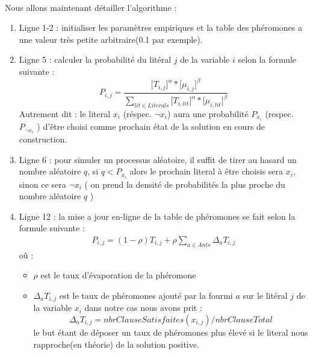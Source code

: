 	\paragraph{}Nous allons maintenant détailler l'algorithme : 
	\begin{enumerate}
		\item Ligne 1-2 : initialiser les paramètres empiriques et la table des phéromones a une valeur très petite arbitraire(0.1 par exemple).
		\item Ligne 5 : calculer la probabilité du litéral $j$ de la variable $i$ selon la formule suivante : \\
		\begin{equation}
			P_{i,j} = \frac{\lbrack T_{i,j} \rbrack^{\alpha}* \lbrack\mu_{i,j}\rbrack^{\beta}}{\sum\limits_{lit \in Literals}{\lbrack T_{i,lit} \rbrack^{\alpha}* \lbrack\mu_{i,lit}\rbrack^{\beta}}}
		\end{equation}
		Autrement dit : le literal $x_{i}$ (réspec. $\lnot x_{i}$) aura une probabilité $P_{x_{i}}$ (respec. $P_{\lnot x_{i}}$ ) d'être choisi comme prochain état de la solution en cours de construction.
		
		\item Ligne 6 : pour simuler un processus aléatoire, il suffit de tirer au hasard un nombre aléatoire $q$, si $q < P_{x_{i}}$ alors le prochain literal à être choisis sera $x_i$, sinon ce sera $\lnot x_i$ ( on prend la densité de probabilités la plus proche du nombre aléatoire $q$ )
		
		
		\item Ligne 12 : la mise a jour en-ligne de la table de phéromones se fait selon la formule suivante : 
		\begin{eqnarray}
			P_{i,j} = (1-\rho)T_{i,j} + \rho \sum_{a \in Ants}{\Delta_a T_{i,j}}
		\end{eqnarray}
		\newpage
		oû : 
		\begin{itemize}
			\item $\rho$ est le taux d'évaporation de la phéromone
			\item $\Delta_a T_{i,j}$ est le taux de phéromones ajouté par la fourmi $a$ sur le litéral $j$ de la variable $x_i$
			dans notre cas nous avons prit : \\
			\begin{equation}
				\Delta_a T_{i,j} = nbrClauseSatisfaites(x_{i,j})/nbrClauseTotal
			\end{equation}
			le but étant de déposer un taux de phéromones plus élevé si le literal nous rapproche(en théorie) de la solution positive.
		\end{itemize}
	\end{enumerate}
	
